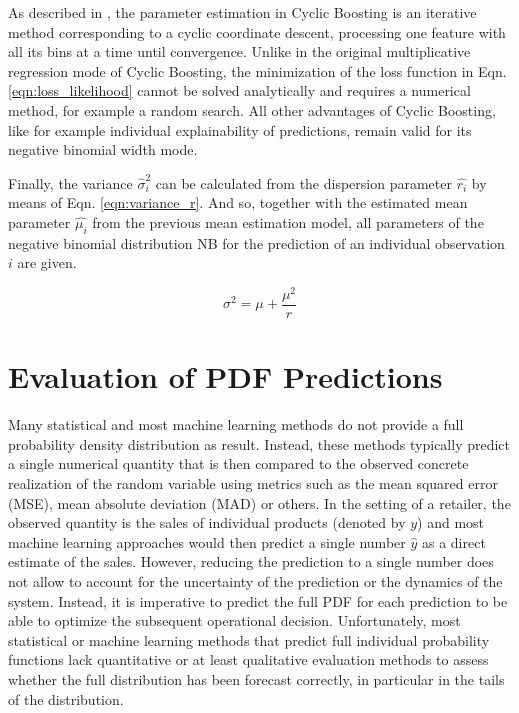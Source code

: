 \documentclass[BCOR=1mm, DIV=calc,10pt,
twoside=true,
twocolumn,
headings=normal]{scrartcl}
\newcommand{\eqn}{Eqn. }
\begin{document}
As described in \cite{Wick2019}, the parameter estimation in Cyclic Boosting is an iterative method corresponding to a cyclic coordinate descent, processing one feature with all its bins at a time until convergence. Unlike in the original multiplicative regression mode of Cyclic Boosting, the minimization of the loss function in \eqn \eqref{eqn:loss_likelihood} cannot be solved analytically and requires a numerical method, for example a random search. All other advantages of Cyclic Boosting, like for example individual explainability of predictions, remain valid for its negative binomial width mode.

Finally, the variance $\hat{\sigma}^2_i$ can be calculated from the dispersion parameter $\hat{r_i}$ by means of \eqn \eqref{eqn:variance_r}. And so, together with the estimated mean parameter $\hat{\mu_i}$ from the previous mean estimation model, all parameters of the negative binomial distribution NB for the prediction of an individual observation $i$ are given.

\begin{equation} \label{eqn:variance_r}
\sigma^2 = \mu + \frac{\mu^2}{r}
\end{equation}


\section{Evaluation of PDF Predictions}
\label{sec:pdfEvaluation}

Many statistical and most machine learning methods do not provide a full probability density distribution as result. Instead, these methods typically predict a single numerical quantity that is then compared to the observed concrete realization of the random variable using metrics such as the mean squared error (MSE),  mean absolute deviation (MAD) or others. In the setting of a retailer, the observed quantity is the sales of individual products (denoted by $y$) and most machine learning approaches would then predict a single number $\hat{y}$ as a direct estimate of the sales. However, reducing the prediction to a single number does not allow to account for the uncertainty of the prediction or the dynamics of the system. Instead, it is imperative to predict the full PDF for each prediction to be able to optimize the subsequent operational decision. Unfortunately, most statistical or machine learning methods that predict full individual probability functions lack quantitative or at least qualitative evaluation methods to assess whether the full distribution has been forecast correctly, in particular in the tails of the distribution.
\end{document}
